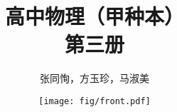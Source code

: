 \documentclass[b5paper, openany]{ctexbook}
\theoremstyle{plain}
\begin{document}














\title{高中物理（甲种本）\\
第三册}

\author{张同恂，方玉珍，马淑美}
\date{\texttt{[image: fig/front.pdf]}}

\maketitle

\tableofcontents


\frontmatter



\mainmatter













\begin{appendix}
	
\end{appendix}
\end{document}
